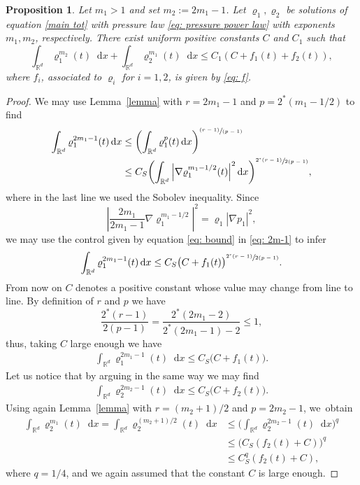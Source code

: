 \documentclass[10pt]{amsart}
\newcommand{\pspfrac}[2]{\sfrac{(#1)}{(#2)}}
\newcommand{\bprt}[1]{\bigl(#1\bigr)}
\newcommand{\bbprt}[1]{\biggl(#1\biggr)}
\newcommand{\dx}[1]{\mathop{}\!\mathrm{d} #1}
\newcommand{\R}{\mathbb{R}}
\theoremstyle{plain}
\newtheorem{proposition}[theorem]{Proposition}
\theoremstyle{remark}
\begin{document}
\begin{proposition}\label{prop: bounds of powers}
Let $m_{1}>1$ and set $m_2:=2m_1-1$. Let $\varrho_1, \varrho_2$ be solutions of equation \eqref{main tot} with pressure law \eqref{eq: pressure power law} with exponents $m_1,m_2$, respectively. There exist uniform positive constants $C$ and $C_1$ such that
\begin{equation*}
\int_{\R^d} \varrho_1^{m_2}(t) \dx x + \int_{\R^d} \varrho_2^{m_1}(t) \dx x \leq C_1(C + f_1(t)+f_2(t)),
\end{equation*}
where $f_i$, associated to $\varrho_i$ for $i=1,2$, is given by \eqref{eq: f}.
\end{proposition}

\begin{proof}
We may use Lemma~\ref{lemma} with $r=2m_1-1$ and $p=2^*(m_1 - 1/2)$ to find
\begin{equation}\label{eq: 2m-1}
\begin{aligned}
\int_{\R^d} \varrho_1^{2m_1-1}(t) \dx x &\leq \bbprt{\int_{\R^d} \varrho_1^{p}(t) \dx x}^{\pspfrac{r-1}{p-1}}\\
&\leq C_S \bbprt{\int_{\R^d} \left|\nabla \varrho_1^{m_1-1/2}(t)\right|^2 \dx x}^{\sfrac{2^*(r-1)}{2(p-1)}},
\end{aligned}
\end{equation}
where in the last line we used the Sobolev inequality.
Since
\begin{equation*}
\left|\frac{2m_{1}}{2{m_{1}}-1}\nabla \varrho_1^{m_1-1/2}\right|^2 = \varrho_1\left|\nabla p_1\right|^2,
\end{equation*}
we may use the control given by equation \eqref{eq: bound} in \eqref{eq: 2m-1} to infer
\begin{align*}
\int_{\R^d} \varrho_1^{2m_1-1}(t) \dx x \leq C_S\bprt{C+ {f_{1}}(t)}^{\sfrac{2^*(r-1)}{2(p-1)}}.
\end{align*}
From now on $C$ denotes a positive constant whose value may change from line to line. By definition of $r$ and $p$ we have
\begin{equation*}
\frac{2^*(r-1)}{2(p-1)}= \frac{2^* (2m_1 -2)}{2^* (2m_1 - 1) -2} \leq 1,
\end{equation*}
thus, taking $C$ large enough we have
\begin{align*}
\int_{\R^d} \varrho_1^{2 m_1-1}(t) \dx x \leq C_S\bprt{C+ {f_{1}}(t)}.
\end{align*}
Let us notice that by arguing in the same way we may find
\begin{align*}
\int_{\R^d} \varrho_2^{2 m_2-1}(t) \dx x \leq C_S\bprt{C+ {f_{2}}(t)}.
\end{align*}
Using again Lemma~\ref{lemma} with $r=(m_2+1)/2$ and $p=2m_2-1$, we~obtain
\begin{align*}
\int_{\R^d} \varrho_2^{m_1}(t) \dx x = \int_{\R^d} \varrho_2^{(m_2+1)/2}(t) \dx x
&\leq \bbprt{\int_{\R^d} \varrho_2^{2m_2-1}(t) \dx x }^{q}\\
&\leq \bprt{C_S({f_{2}}(t)+C)}^q\\
&\leq C_S^q({f_{2}}(t)+C),
\end{align*}
where $q=1/4$, and we again assumed that the constant $C$ is large enough.
\end{proof}
\end{document}
